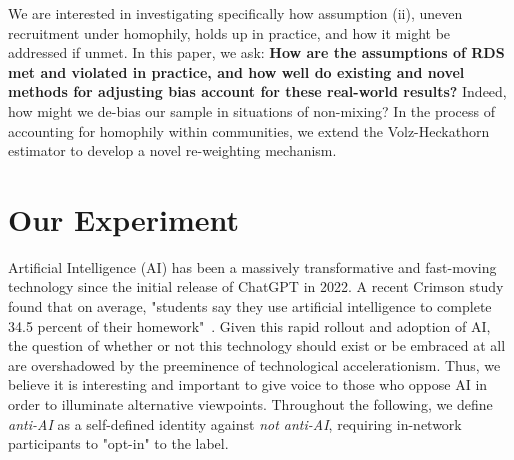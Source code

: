 \documentclass[11pt,a4paper,twocolumn,twoside]{rho-class/rho}
\begin{document}
We are interested in investigating specifically how assumption (ii), uneven recruitment under homophily, holds up in practice, and how it might be addressed if unmet. In this paper, we ask: \textbf{How are the assumptions of RDS met and violated in practice, and how well do existing and novel methods for adjusting bias account for these real-world results?} Indeed, how might we de-bias our sample in situations of non-mixing? In the process of accounting for homophily within communities, we extend the Volz-Heckathorn estimator to develop a novel re-weighting mechanism. 

\section{Our Experiment}
Artificial Intelligence (AI) has been a massively transformative and fast-moving technology since the initial release of ChatGPT in 2022. A recent Crimson study found that on average, "students say they use artificial intelligence to complete 34.5 percent of their homework"~\cite{crimson2026aisurvey}. Given this rapid rollout and adoption of AI, the question of whether or not this technology should exist or be embraced at all are overshadowed by the preeminence of technological accelerationism. Thus, we believe it is interesting and important to give voice to those who oppose AI in order to illuminate alternative viewpoints. Throughout the following, we define \textit{anti-AI} as a self-defined identity against \textit{not anti-AI}, requiring in-network participants to "opt-in" to the label.
\end{document}
